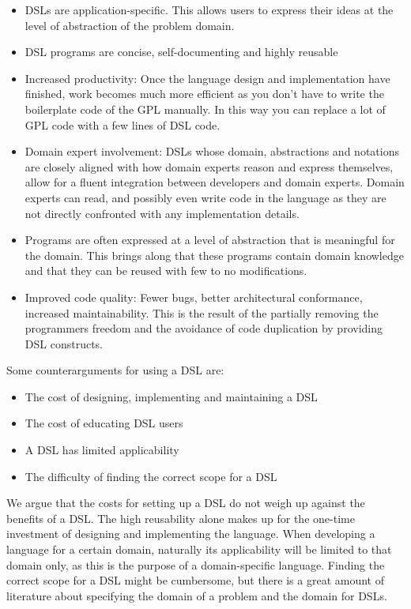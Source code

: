 \begin{itemize}
\item DSLs are application-specific. This allows users to express their ideas at the level of abstraction of the problem domain.
\item DSL programs are concise, self-documenting and highly reusable\cite{Bentley:1986}
\item Increased productivity: Once the language design and implementation have finished, work becomes much more efficient as you don't have to write the boilerplate code of the GPL manually. In this way you can replace a lot of GPL code with a few lines of DSL code.
\item Domain expert involvement: DSLs whose domain, abstractions and notations are closely aligned with how domain experts reason and express themselves, allow for a fluent integration between developers and domain experts. Domain experts can read, and possibly even write code in the language as they are not directly confronted with any implementation details.
\item Programs are often expressed at a level of abstraction that is meaningful for the domain. This brings along that these programs contain domain knowledge and that they can be reused with few to no modifications.
\item Improved code quality: Fewer bugs, better architectural conformance, increased maintainability. This is the result of the partially removing the programmers freedom and the avoidance of code duplication by providing DSL constructs.
\end{itemize}

\noindent Some counterarguments for using a DSL are:
\begin{itemize}
\item The cost of designing, implementing and maintaining a DSL
\item The cost of educating DSL users
\item A DSL has limited applicability
\item The difficulty of finding the correct scope for a DSL
\end{itemize}

We argue that the costs for setting up a DSL do not weigh up against the benefits of a DSL. The high reusability alone makes up for the one-time investment of designing and implementing the language. When developing a language for a certain domain, naturally its applicability will be limited to that domain only, as this is the purpose of a domain-specific language. Finding the correct scope for a DSL might be cumbersome, but there is a great amount of literature about specifying the domain of a problem\cite{Simos:1995} and the domain for DSLs\cite{karsai2014design}\cite{gunther2010agile}. 

